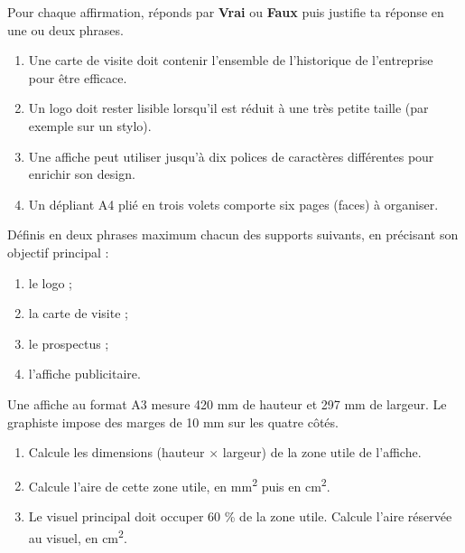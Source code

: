 \documentclass[11pt]{article}
\newcommand{\cle}[1]{{\popxbold\color{popdark}#1}}
\newcounter{popsec}
\newcounter{popsub}
\newcommand{\courssub}[1]{%
  \stepcounter{popsub}%
  \par\vspace{9pt}\noindent{\popxbold\fontsize{11.5}{13}\selectfont\color{popink}{\color{poporange}\thepopsec.\thepopsub}\hspace{6pt}#1}\par\nopagebreak\vspace{4pt}
}
\begin{document}
\begin{exercice}
Pour chaque affirmation, réponds par \textbf{Vrai} ou \textbf{Faux} puis justifie ta réponse en une ou deux phrases.

\begin{enumerate}
\item Une carte de visite doit contenir l'ensemble de l'historique de l'entreprise pour être efficace.
\item Un logo doit rester lisible lorsqu'il est réduit à une très petite taille (par exemple sur un stylo).
\item Une affiche peut utiliser jusqu'à dix polices de caractères différentes pour enrichir son design.
\item Un dépliant A4 plié en trois volets comporte six pages (faces) à organiser.
\end{enumerate}
\end{exercice}

\begin{exercice}[Définitions]
Définis en deux phrases maximum chacun des supports suivants, en précisant son objectif principal :
\begin{enumerate}
\item le logo ;
\item la carte de visite ;
\item le prospectus ;
\item l'affiche publicitaire.
\end{enumerate}
\end{exercice}

\begin{exercice}
Une affiche au format A3 mesure 420 mm de hauteur et 297 mm de largeur. Le graphiste impose des marges de 10 mm sur les quatre côtés.
\begin{enumerate}
\item Calcule les dimensions (hauteur $\times$ largeur) de la \cle{zone utile} de l'affiche.
\item Calcule l'aire de cette zone utile, en mm\textsuperscript{2} puis en cm\textsuperscript{2}.
\item Le visuel principal doit occuper 60 \% de la zone utile. Calcule l'aire réservée au visuel, en cm\textsuperscript{2}.
\end{enumerate}
\end{exercice}

\courssub{Je m'entraîne}
\end{document}
